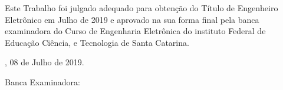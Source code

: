 \documentclass{ifscTCC} %
\begin{document}
%

\setcounter{page}{4}
\begin{folhadeaprovacao}
    \begin{center}
        \begin{center}
            \ABNTEXchapterfont\SingleSpacing\bfseries\Large\MakeUppercase\imprimirtitulo
        \end{center}
            
        \vspace*{2.0cm}
            
        \ABNTEXchapterfont\normalsize\bfseries\MakeUppercase\imprimirautor
            
        \vspace*{1.0cm}
    \end{center}
    
    
    \noindent\OnehalfSpacing Este Trabalho foi julgado adequado para obtenção do Título de Engenheiro Eletrônico em Julho de 2019 e aprovado na sua forma final pela banca examinadora do Curso de Engenharia Eletrônica do instituto Federal de Educação Ciência, e Tecnologia de Santa Catarina.
        
    \vspace*{1.0cm}
    \begin{center}    
        \imprimirlocal, 08 de Julho de 2019.
    \end{center}
    
    \noindent Banca Examinadora:
    

\end{folhadeaprovacao}
\cleardoublepage
\end{document}
